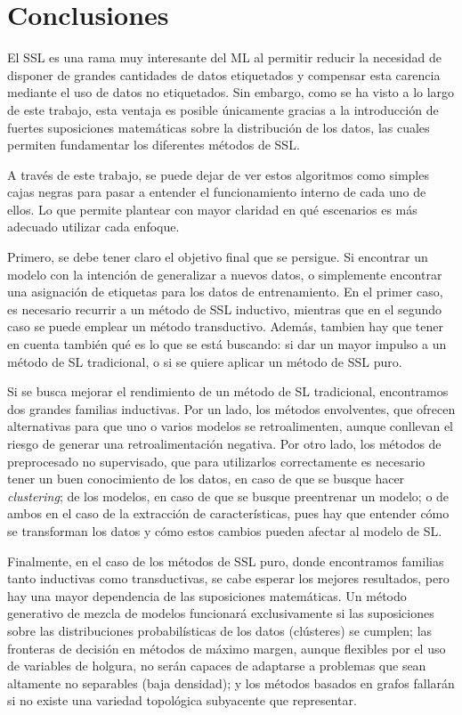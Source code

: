 \chapter{Conclusiones}

El \gls{SSL} es una rama muy interesante del \gls{ML} al permitir reducir la necesidad de disponer de grandes cantidades de datos etiquetados y compensar esta carencia mediante el uso de datos no etiquetados. Sin embargo, como se ha visto a lo largo de este trabajo, esta ventaja es posible únicamente gracias a la introducción de fuertes suposiciones matemáticas sobre la distribución de los datos, las cuales permiten fundamentar los diferentes métodos de \gls{SSL}.

A través de este trabajo, se puede dejar de ver estos algoritmos como simples cajas negras para pasar a entender el funcionamiento interno de cada uno de ellos. Lo que permite plantear con mayor claridad en qué escenarios es más adecuado utilizar cada enfoque.

Primero, se debe tener claro el objetivo final que se persigue. Si encontrar un modelo con la intención de generalizar a nuevos datos, o simplemente encontrar una asignación de etiquetas para los datos de entrenamiento. En el primer caso, es necesario recurrir a un método de \gls{SSL} inductivo, mientras que en el segundo caso se puede emplear un método transductivo. Además, tambien hay que tener en cuenta también qué es lo que se está buscando: si dar un mayor impulso a un método de \gls{SL} tradicional, o si se quiere aplicar un método de \gls{SSL} puro.

Si se busca mejorar el rendimiento de un método de \gls{SL} tradicional, encontramos dos grandes familias inductivas. Por un lado, los métodos envolventes, que ofrecen alternativas para que uno o varios modelos se retroalimenten, aunque conllevan el riesgo de generar una retroalimentación negativa. Por otro lado, los métodos de preprocesado no supervisado, que para utilizarlos correctamente es necesario tener un buen conocimiento de los datos, en caso de que se busque hacer \textit{clustering}; de los modelos, en caso de que se busque preentrenar un modelo; o de ambos en el caso de la extracción de características, pues hay que entender cómo se transforman los datos y cómo estos cambios pueden afectar al modelo de \gls{SL}.

Finalmente, en el caso de los métodos de \gls{SSL} puro, donde encontramos familias tanto inductivas como transductivas, se cabe esperar los mejores resultados, pero hay una mayor dependencia de las suposiciones matemáticas. Un método generativo de mezcla de modelos funcionará exclusivamente si las suposiciones sobre las distribuciones probabilísticas de los datos (clústeres) se cumplen; las fronteras de decisión en métodos de máximo margen, aunque flexibles por el uso de variables de holgura, no serán capaces de adaptarse a problemas que sean altamente no separables (baja densidad); y los métodos basados en grafos fallarán si no existe una variedad topológica subyacente que representar.

